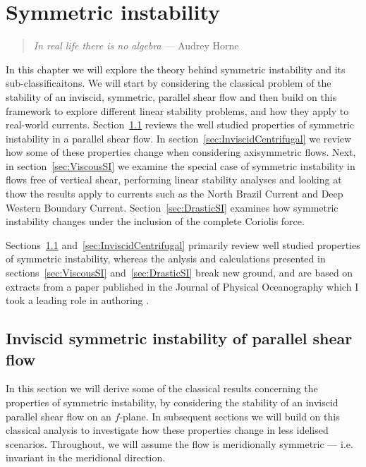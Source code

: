 \chapter{Symmetric instability}
\begin{quote}
    \textit{In real life there is no algebra} --- Audrey Horne
\end{quote}

In this chapter we will explore the theory behind symmetric instability and its sub-classificaitons. We will start by considering the classical problem of the stability of an inviscid, symmetric, parallel shear flow and then build on this framework to explore different linear stability problems, and how they apply to real-world currents. Section~\ref{sec:InviscidInstabilities} reviews the well studied properties of symmetric instability in a parallel shear flow. In section~\ref{sec:InviscidCentrifugal} we review how some of these properties change when considering axisymmetric flows. Next, in section~\ref{sec:ViscousSI} we examine the special case of symmetric instability in flows free of vertical shear, performing linear stability analyses and looking at thow the results apply to currents such as the North Brazil Current and Deep Western Boundary Current. Section~\ref{sec:DrasticSI} examines how symmetric instability changes under the inclusion of the complete Coriolis force.

Sections~\ref{sec:InviscidInstabilities} and~\ref{sec:InviscidCentrifugal} primarily review well studied properties of symmetric instability, whereas the anlysis and calculations presented in sections~\ref{sec:ViscousSI} and~\ref{sec:DrasticSI} break new ground, and are based on extracts from a paper published in the Journal of Physical Oceanography which I took a leading role in authoring \citep{Goldsworth2021a}.

\section{Inviscid symmetric instability of parallel shear flow}
\label{sec:InviscidInstabilities}
    In this section we will derive some of the classical results concerning the properties of symmetric instability, by considering the stability of an inviscid parallel shear flow on an $f$-plane. In subsequent sections we will build on this classical analysis to investigate how these properties change in less idelised scenarios. Throughout, we will assume the flow is meridionally symmetric --- i.e. invariant in the meridional direction.

